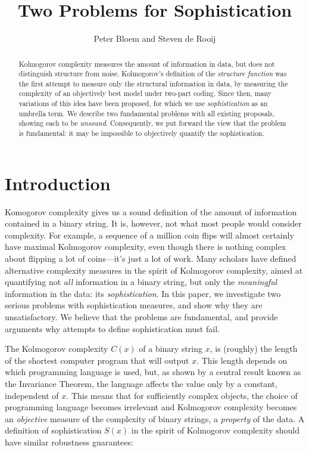 \documentclass{style/llncs}
\title{Two Problems for Sophistication}
\author{Peter Bloem and Steven de Rooij}
\institute{
  System and Network Engineering Group, \\University of Amsterdam, the Netherlands\\
  \email{uva@peterbloem.nl, steven.de.rooij@gmail.com}
}
\begin{document}
 
\maketitle

\begin{abstract}
Kolmogorov complexity measures the amount of information in data, but does not distinguish structure from noise. Kolmogorov's definition of the \emph{structure function} was the first attempt to measure only the structural information in data, by measuring the complexity of an objectively best model under two-part coding. Since then, many variations of this idea have been proposed, for which we use \emph{sophistication} as an umbrella term. We describe two fundamental problems with all existing proposals, showing each  to be \emph{unsound}. Consequently, we put forward the view that the problem is fundamental: it may be impossible to objectively quantify the sophistication.
\end{abstract}

\section{Introduction}\enlargethispage{4ex}
Komogorov complexity gives us a sound definition of the amount of information contained in a binary string. It is, however, not what most people would consider complexity. For example, a sequence of a million coin flips will almost certainly have maximal Kolmogorov complexity, even though there is nothing complex about flipping a lot of coins---it's just a lot of work. Many scholars have defined alternative complexity measures in the spirit of Kolmogorov complexity, aimed at quantifying not \emph{all} information in a binary string, but only the \emph{meaningful} information in the data: its \emph{sophistication}. In this paper, we investigate two serious problems with sophistication measures, and show why they are unsatisfactory. We believe that the problems are fundamental, and provide arguments why attempts to define sophistication must fail.

The Kolmogorov complexity $C(x)$ of a binary string $x$, is (roughly) the length of the shortest computer program that will output $x$. This length depends on which programming language is used, but, as shown by a central result known as the Invariance Theorem\cite[Section~2.1]{li1993introduction}, the language affects the value only by a constant, independent of $x$. This means that for sufficiently complex objects, the choice of programming language becomes irrelevant and Kolmogorov complexity becomes an \emph{objective} measure of the complexity of binary strings, a \emph{property} of the data. A definition of sophistication $S(x)$ in the spirit of Kolmogorov complexity should have similar robustness guarantees:
\end{document}
